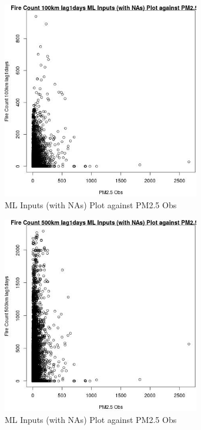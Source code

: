 \begin{figure} 
\centering  
\includegraphics[width=0.77\textwidth]{Code_Outputs/Report_ML_input_PM25_Step4_part_e_de_duplicated_aves_compiled_2019-05-20wNAs_Fire_Count_100km_lag1daysvPM25_Obs.jpg} 
\caption{\label{fig:Report_ML_input_PM25_Step4_part_e_de_duplicated_aves_compiled_2019-05-20wNAsFire_Count_100km_lag1daysvPM25_Obs}ML Inputs (with NAs) Plot against PM2.5 Obs} 
\end{figure} 
 

\begin{figure} 
\centering  
\includegraphics[width=0.77\textwidth]{Code_Outputs/Report_ML_input_PM25_Step4_part_e_de_duplicated_aves_compiled_2019-05-20wNAs_Fire_Count_500km_lag1daysvPM25_Obs.jpg} 
\caption{\label{fig:Report_ML_input_PM25_Step4_part_e_de_duplicated_aves_compiled_2019-05-20wNAsFire_Count_500km_lag1daysvPM25_Obs}ML Inputs (with NAs) Plot against PM2.5 Obs} 
\end{figure} 
 

